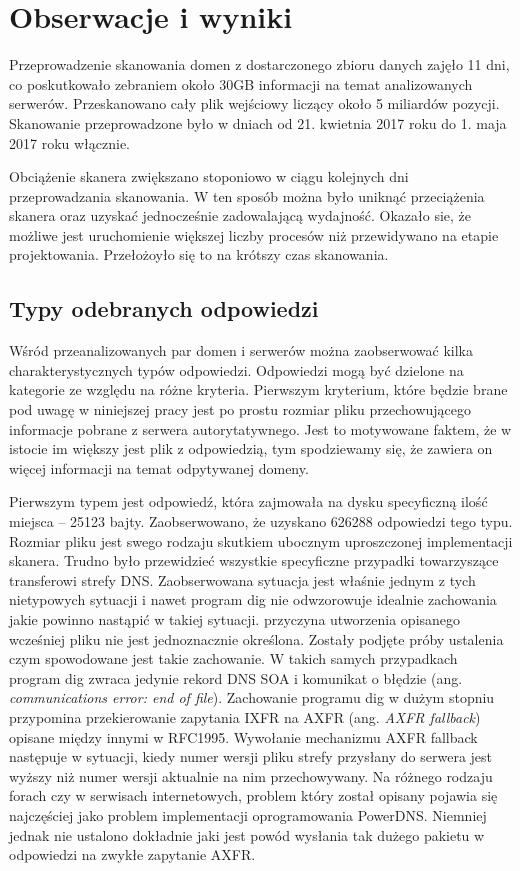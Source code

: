 \chapter{Obserwacje i wyniki}
Przeprowadzenie skanowania domen z dostarczonego zbioru danych zajęło 11 dni, co poskutkowało zebraniem około 30GB informacji na temat analizowanych serwerów. Przeskanowano cały plik wejściowy liczący około 5 miliardów pozycji. Skanowanie przeprowadzone było w dniach od 21. kwietnia 2017 roku do 1. maja 2017 roku włącznie. 

Obciążenie skanera zwiększano stoponiowo w ciągu kolejnych dni przeprowadzania skanowania. W ten sposób można było uniknąć przeciążenia skanera oraz uzyskać jednocześnie zadowalającą wydajność. Okazało sie, że możliwe jest uruchomienie większej liczby procesów niż przewidywano na etapie projektowania. Przełożoyło się to na krótszy czas skanowania.

\section{Typy odebranych odpowiedzi}
Wśród przeanalizowanych par domen i serwerów można zaobserwować kilka charakterystycznych typów odpowiedzi. Odpowiedzi mogą być dzielone na kategorie ze względu na różne kryteria. Pierwszym kryterium, które będzie brane pod uwagę w niniejszej pracy jest po prostu rozmiar pliku przechowującego informacje pobrane z serwera autorytatywnego. Jest to motywowane faktem, że w istocie im większy jest plik z odpowiedzią, tym spodziewamy się, że zawiera on więcej informacji na temat odpytywanej domeny. 

Pierwszym typem jest odpowiedź, która zajmowała na dysku specyficzną ilość miejsca -- 25123 bajty. Zaobserwowano, że uzyskano 626288 odpowiedzi tego typu. Rozmiar pliku jest swego rodzaju skutkiem ubocznym uproszczonej implementacji skanera. Trudno było przewidzieć wszystkie specyficzne przypadki towarzyszące transferowi strefy DNS. Zaobserwowana sytuacja jest właśnie jednym z tych nietypowych sytuacji i nawet program dig nie odwzorowuje idealnie zachowania jakie powinno nastąpić w takiej sytuacji. przyczyna utworzenia opisanego wcześniej pliku nie jest jednoznacznie określona. Zostały podjęte próby ustalenia czym spowodowane jest takie zachowanie. W takich samych przypadkach program dig zwraca jedynie rekord DNS SOA i komunikat o błędzie (ang. \textit{communications error: end of file}). Zachowanie programu dig w dużym stopniu przypomina przekierowanie zapytania IXFR na AXFR (ang. \textit{AXFR fallback}) opisane między innymi w RFC1995\cite{RFC1995}. Wywołanie mechanizmu AXFR fallback następuje w sytuacji, kiedy numer wersji pliku strefy przysłany do serwera jest wyższy niż numer wersji aktualnie na nim przechowywany. Na różnego rodzaju forach\cite{powerdns-forum} czy w serwisach internetowych\cite{powerdns-git}, problem który został opisany pojawia się najczęściej jako problem implementacji oprogramowania PowerDNS\cite{powerdns}. Niemniej jednak nie ustalono dokładnie jaki jest powód wysłania tak dużego pakietu w odpowiedzi na zwykłe zapytanie AXFR.

